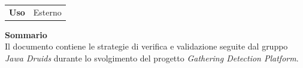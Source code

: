 \begin{titlepage}
\begin{center}
\begin{table}[H]
\begin{tabular}{r | l}
					\textbf{Uso} & Esterno  
				\end{tabular}
			\end{table}
			\vspace{0.1cm}
			\hfill \break
			\fontsize{17}{10}\textbf{Sommario} \\
			\vspace{0.1cm}
			Il documento contiene le strategie di verifica e validazione seguite dal gruppo \emph{\normalsize\textit{Jawa Druids}} durante lo svolgimento del progetto \emph{\normalsize\textit{Gathering Detection Platform}}.
		\end{center}
	\end{titlepage}
	\makeatother
	
	
	\tableofcontents{}
	\listoffigures
	\listoftables
	
	
	
	
	
	
	
	
	
	
	

